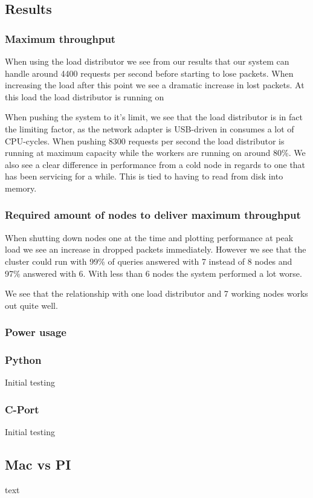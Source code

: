\subsection{Results}
\subsubsection{Maximum throughput}
When using the load distributor we see from our results that our system can handle around 4400 requests per second before starting to lose packets. When increasing the load after this point we see a dramatic increase in lost packets. At this load the load distributor is running on 

When pushing the system to it's limit, we see that the load distributor is in fact the limiting factor, as the network adapter is USB-driven in consumes a lot of CPU-cycles. When pushing 8300 requests per second the load distributor is running at maximum capacity while the workers are running on around 80\%. We also see a clear difference in performance from a cold node in regards to one that has been servicing for a while. This is tied to having to read from disk into memory.

\subsubsection{Required amount of nodes to deliver maximum throughput}
When shutting down nodes one at the time and plotting performance at peak load we see an increase in dropped packets immediately. However we see that the cluster could run with 99\% of queries answered with 7 instead of 8 nodes and 97\% answered with 6. With less than 6 nodes the system performed a lot worse. 

We see that the relationship with one load distributor and 7 working nodes works out quite well.

\subsubsection{Power usage}



\subsubsection{Python}
Initial testing

\subsubsection{C-Port}
Initial testing
\subsection{Mac vs PI}
text

